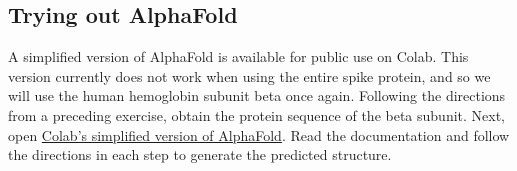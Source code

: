 \subsection{Trying out AlphaFold}

A simplified version of AlphaFold is available for public use on Colab. This version currently does not work when using the entire spike protein, and so we will use the human hemoglobin subunit beta once again. Following the directions from a preceding exercise, obtain the protein sequence of the beta subunit. Next, open \href{https://colab.research.google.com/github/deepmind/alphafold/blob/main/notebooks/AlphaFold.ipynb#scrollTo=woIxeCPygt7K}{Colab's simplified version of AlphaFold}. Read the documentation and follow the directions in each step to generate the predicted structure.\\

\begin{exercise}\end{exercise}
